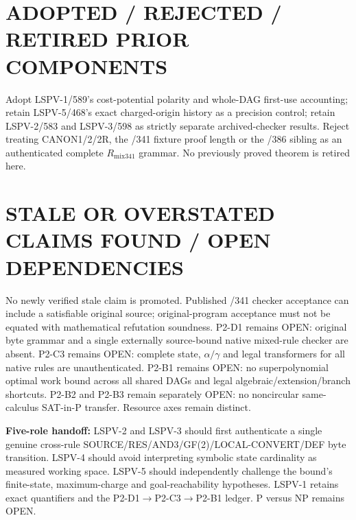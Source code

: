 \documentclass[11pt]{article}
\begin{document}
\section*{ADOPTED / REJECTED / RETIRED PRIOR COMPONENTS}
Adopt LSPV-1/589's cost-potential polarity and whole-DAG first-use accounting;
retain LSPV-5/468's exact charged-origin history as a precision control;
retain LSPV-2/583 and LSPV-3/598 as strictly separate archived-checker results.
Reject treating CANON1/2/2R, the /341 fixture proof length or the /386 sibling
as an authenticated complete $R_{\mathrm{mix341}}$ grammar.
No previously proved theorem is retired here.

\section*{STALE OR OVERSTATED CLAIMS FOUND / OPEN DEPENDENCIES}
No newly verified stale claim is promoted. Published /341 checker acceptance
can include a satisfiable original source; original-program acceptance must
not be equated with mathematical refutation soundness.
P2-D1 remains OPEN: original byte grammar and a single externally source-bound
native mixed-rule checker are absent. P2-C3 remains OPEN: complete state,
$\alpha/\gamma$ and legal transformers for all native rules are unauthenticated.
P2-B1 remains OPEN: no superpolynomial optimal work bound across all shared DAGs
and legal algebraic/extension/branch shortcuts.
P2-B2 and P2-B3 remain separately OPEN: no noncircular same-calculus
SAT-in-P transfer. Resource axes remain distinct.

\textbf{Five-role handoff:} LSPV-2 and LSPV-3 should first authenticate
a single genuine cross-rule SOURCE/RES/AND3/GF(2)/LOCAL-CONVERT/DEF byte transition.
LSPV-4 should avoid interpreting symbolic state cardinality as measured
working space. LSPV-5 should independently challenge the bound's
finite-state, maximum-charge and goal-reachability hypotheses. LSPV-1
retains exact quantifiers and the P2-D1$\to$P2-C3$\to$P2-B1 ledger.
P versus NP remains OPEN.
\end{document}
